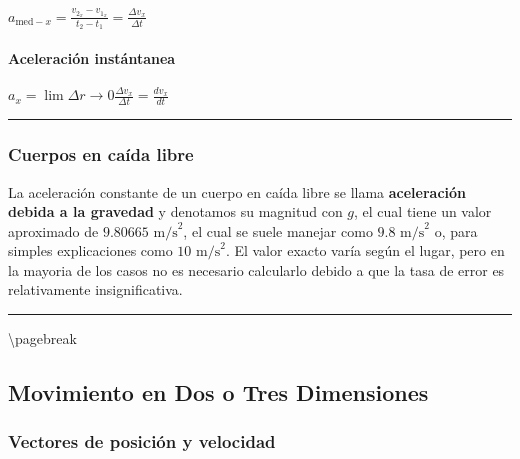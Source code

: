 \documentclass[
]{article}
\begin{document}
{\(a_{\text{med} - x} = \frac{v_{2_{x}} - v_{1_{x}}}{t_{2} - t_{1}} = \frac{\Delta v_{x}}{\Delta t}\)}

\hypertarget{aceleraciuxf3n-instuxe1ntanea}{%
\paragraph{Aceleración
instántanea}\label{aceleraciuxf3n-instuxe1ntanea}}

{\(a_{x} = \lim{\Delta r \rightarrow 0}\frac{\Delta v_{x}}{\Delta t} = \frac{dv_{x}}{dt}\)}

\begin{center}\rule{0.5\linewidth}{0.5pt}\end{center}

\hypertarget{cuerpos-en-cauxedda-libre}{%
\subsubsection{Cuerpos en caída libre}\label{cuerpos-en-cauxedda-libre}}

La aceleración constante de un cuerpo en caída libre se llama
\textbf{aceleración debida a la gravedad} y denotamos su magnitud con
{\(g\)}, el cual tiene un valor aproximado de
{\(9.80665\text{~m/s}^{2}\)}, el cual se suele manejar como
{\(9.8\text{~m/s}^{2}\)} o, para simples explicaciones como
{\(10\text{~m/s}^{2}\)}. El valor exacto varía según el lugar, pero en
la mayoria de los casos no es necesario calcularlo debido a que la tasa
de error es relativamente insignificativa.

\begin{center}\rule{0.5\linewidth}{0.5pt}\end{center}

\textbackslash pagebreak

\hypertarget{movimiento-en-dos-o-tres-dimensiones}{%
\subsection{Movimiento en Dos o Tres
Dimensiones}\label{movimiento-en-dos-o-tres-dimensiones}}

\hypertarget{vectores-de-posiciuxf3n-y-velocidad}{%
\subsubsection{Vectores de posición y
velocidad}\label{vectores-de-posiciuxf3n-y-velocidad}}
\end{document}
